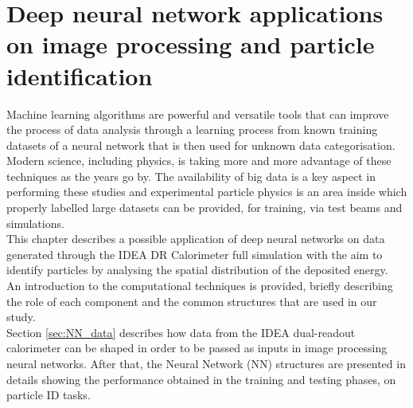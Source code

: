 \chapter[Deep neural network applications]{Deep neural network applications on image processing and particle identification} \label{sec:NN_img}
Machine learning algorithms are powerful and versatile tools that can improve the process of data analysis through a learning process from known training datasets of a neural network that is then used for unknown data categorisation. Modern science, including physics, is taking more and more advantage of these techniques as the years go by.
The availability of big data is a key aspect in performing these studies and experimental particle physics is an area inside which properly labelled large datasets can be provided, for training, via test beams and simulations.\\

This chapter describes a possible application of deep neural networks on data generated through the IDEA DR Calorimeter full simulation with the aim to identify particles by analysing the spatial distribution of the deposited energy.\\
An introduction to the computational techniques is provided, briefly describing the role of each component and the common structures that are used in our study.\\

Section \ref{sec:NN_data} describes how data from the IDEA dual-readout calorimeter can be shaped in order to be passed as inputs in image processing neural networks.
After that, the Neural Network (NN) structures are presented in details showing the performance obtained in the training and testing phases, on particle ID tasks.\\

